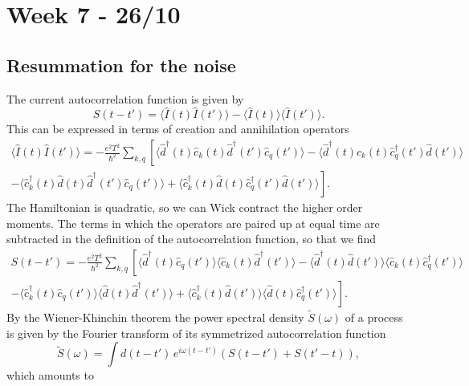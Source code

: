 \section{Week 7 - 26/10}
\subsection{Resummation for the noise}
The current autocorrelation function is given by
\begin{equation}
    S(t-t') = \langle \hat{I}(t)\hat{I}(t') \rangle - \langle\hat{I}(t)\rangle \langle\hat{I}(t')\rangle. 
\end{equation}
This can be expressed in terms of creation and annihilation operators
\begin{align}
    \langle\hat{I}(t)\hat{I}(t')\rangle = -\frac{e^2 T^2}{\hbar^2}\sum_{k,q} \left[
    \langle\hat{d}^\dagger(t)\hat{c}_k(t)\hat{d}^\dagger(t')\hat{c}_q(t')\rangle - 
    \langle\hat{d}^\dagger(t)\hat{c}_k(t)\hat{c}_q^\dagger(t')\hat{d}(t')\rangle \right.\nonumber\\
    \left.- \langle\hat{c}_k^\dagger(t)\hat{d}(t)\hat{d}^\dagger(t')\hat{c}_q(t')\rangle +
    \langle\hat{c}_k^\dagger(t)\hat{d}(t)\hat{c}_q^\dagger(t')\hat{d}(t')\rangle \right].
\end{align}
The Hamiltonian is quadratic, so we can Wick contract the higher order moments. The terms in which the operators are paired up at equal time are subtracted in the definition of the autocorrelation function, so that we find
\begin{align}
    S(t-t') = -\frac{e^2 T^2}{\hbar^2}\sum_{k,q} \left[
    \langle\hat{d}^\dagger(t)\hat{c}_q(t')\rangle\langle\hat{c}_k(t)\hat{d}^\dagger(t')\rangle - 
    \langle\hat{d}^\dagger(t)\hat{d}(t')\rangle\langle\hat{c}_k(t)\hat{c}_q^\dagger(t')\rangle \right.\nonumber\\
    \left.- \langle\hat{c}_k^\dagger(t)\hat{c}_q(t')\rangle\langle\hat{d}(t)\hat{d}^\dagger(t')\rangle +
    \langle\hat{c}_k^\dagger(t)\hat{d}(t')\rangle\langle\hat{d}(t)\hat{c}_q^\dagger(t')\rangle \right].
\end{align}
By the Wiener-Khinchin theorem the power spectral density $\tilde{S}(\omega)$ of a process is given by the Fourier transform of its symmetrized autocorrelation function
\begin{equation}
    \tilde{S}(\omega) = \int d(t-t')\,e^{i\omega(t-t')}\left(S(t-t')+S(t'-t)\right),
\end{equation}
which amounts to
